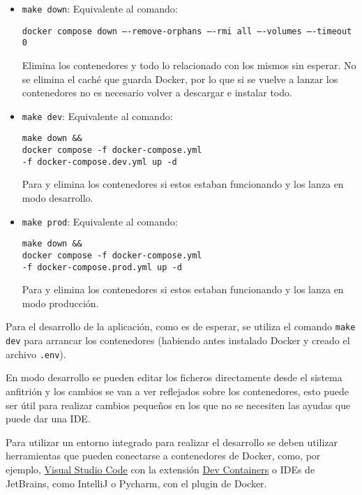 \begin{itemize}
    \item \texttt{make down}: Equivalente al comando:
          \begin{flushleft}
              \texttt{docker compose down ----remove-orphans ----rmi all ----volumes ----timeout 0}
          \end{flushleft}
          Elimina los contenedores y todo lo relacionado con los mismos sin
          esperar. No se elimina el caché que guarda Docker, por lo que si se
          vuelve a lanzar los contenedores no es necesario volver a descargar e
          instalar todo.

    \item \texttt{make dev}: Equivalente al comando:
          \begin{flushleft}
              \texttt{make down \&\& \\
                  docker compose -f docker-compose.yml \\
                  -f docker-compose.dev.yml up -d}
          \end{flushleft}
          Para y elimina los contenedores si estos estaban funcionando y los
          lanza en modo desarrollo.

    \item \texttt{make prod}: Equivalente al comando:
          \begin{flushleft}
              \texttt{make down \&\& \\
                  docker compose -f docker-compose.yml \\
                  -f docker-compose.prod.yml up -d}
          \end{flushleft}
          Para y elimina los contenedores si estos estaban funcionando y los
          lanza en modo producción.
\end{itemize}

Para el desarrollo de la aplicación, como es de esperar, se utiliza el comando
\texttt{make dev} para arrancar los contenedores (habiendo antes instalado
Docker y creado el archivo \texttt{.env}).

En modo desarrollo se pueden editar los ficheros directamente desde el sistema
anfitrión y los cambios se van a ver reflejados sobre los contenedores, esto
puede ser útil para realizar cambios pequeños en los que no se necesiten las
ayudas que puede dar una IDE.

Para utilizar un entorno integrado para realizar el desarrollo se deben utilizar
herramientas que pueden conectarse a contenedores de Docker, como, por ejemplo,
\href{https://code.visualstudio.com/}{Visual Studio Code} con la extensión
\href{https://marketplace.visualstudio.com/items?itemName=ms-vscode-remote.remote-containers}{Dev
    Containers} o IDEs de JetBrains, como IntelliJ o Pycharm, con el plugin de
Docker.

